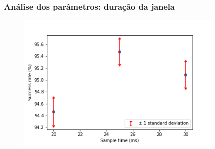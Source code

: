 \documentclass{beamer}
\begin{document}
\begin{frame}
    \frametitle{Análise dos parâmetros: duração da janela}

    \begin{figure}[]
        \centering
        \includegraphics[height=192pt]{Figure_2.png}
    \end{figure}

\end{frame}
\end{document}
